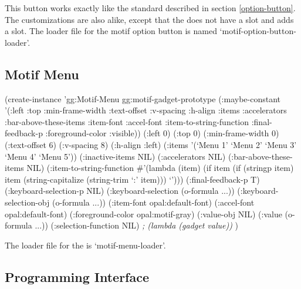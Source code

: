 This button works exactly like the standard  described
in section \ref{option-button}.
The customizations are also alike, except that the 
does not have a  slot and adds a
 slot.  The loader file for the motif option button
is named `motif-option-button-loader'.



\begin{group}
\section{Motif Menu}
\label{motif-menu}

\begin{programexample}
(create-instance 'gg:Motif-Menu gg:motif-gadget-prototype
   (:maybe-constant '(:left :top :min-frame-width :text-offset :v-spacing :h-align
                      :items :accelerators :bar-above-these-items :item-font
                      :accel-font :item-to-string-function :final-feedback-p
                      :foreground-color :visible))
   (:left 0)
   (:top 0)
   (:min-frame-width 0)
   (:text-offset 6)
   (:v-spacing 8)
   (:h-align :left)
   (:items '(`Menu 1' `Menu 2' `Menu 3' `Menu 4' `Menu 5'))
   (:inactive-items NIL)
   (:accelerators NIL)
   (:bar-above-these-items NIL)
   (:item-to-string-function
    \#'(lambda (item)
	(if item
	    (if (stringp item)
		item
		(string-capitalize (string-trim `:' item)))
	    `')))
   (:final-feedback-p T)
   (:keyboard-selection-p NIL)
   (:keyboard-selection (o-formula ...))
   (:keyboard-selection-obj (o-formula ...))
   (:item-font opal:default-font)
   (:accel-font opal:default-font)
   (:foreground-color opal:motif-gray)
   (:value-obj NIL)
   (:value (o-formula ...))
   (:selection-function NIL)   {\it ; (lambda (gadget value))}
   )
\end{programexample}
\end{group}

\begin{center}
\end{center}

The loader file for the  is `motif-menu-loader'.


\subsection{Programming Interface}

